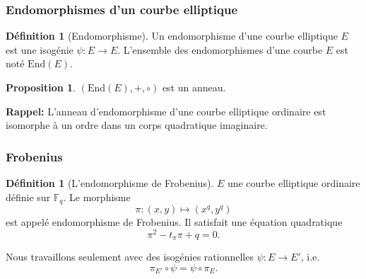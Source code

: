 \documentclass[10pt,a4paper]{beamer}
\theoremstyle{plain}
\theoremstyle{definition}
\theoremstyle{definition}
\theoremstyle{definition}
\newtheorem{prop}[thm]{Proposition}
\theoremstyle{definition}
\newtheorem{defi}[thm]{Définition}
\theoremstyle{remark}
\theoremstyle{remark}
\begin{document}
\begin{frame}

\end{frame}

\begin{frame}
\frametitle{Endomorphismes d'un courbe elliptique}
\begin{defi}[Endomorphisme]
Un endomorphisme d'une courbe elliptique $E$ est une isogénie $\psi:E \rightarrow E$. L'ensemble des endomorphismes d'une courbe $E$ est noté $\mathrm{End}(E)$.
\end{defi}

\begin{prop}
$\left( \mathrm{End}(E),+,\circ \right)$ est un anneau.
\end{prop}
\textbf{Rappel:} L'anneau d'endomorphisme d'une courbe elliptique ordinaire est isomorphe à un ordre dans un corps quadratique imaginaire.
\end{frame}


\begin{frame}
\frametitle{Frobenius}
\begin{defi}[L'endomorphisme de Frobenius]
$E$ une courbe elliptique ordinaire définie sur $\mathbb{F}_q$. Le morphisme
\[ \pi:(x,y) \mapsto (x^q,y^q)\] est appelé endomorphisme de Frobenius. Il
satisfait une équation quadratique \[ \pi^2 - t_\pi \pi + q = 0.\]
\end{defi}

Nous travaillons seulement avec des isogénies rationnelles $\psi:E \to E'$, i.e.
\[
\pi_{E'} \circ \psi =\psi \circ \pi_{E}.
 \]
 
\end{frame}

%
%
%
\end{document}
